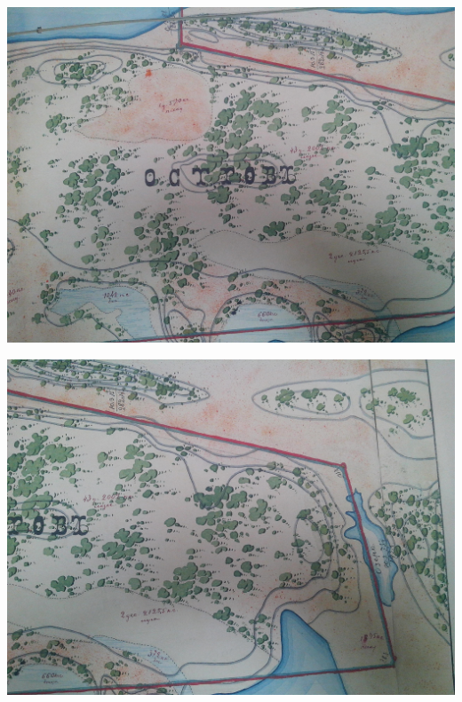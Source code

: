 \begin{center}
\includegraphics[width=\linewidth]{chast-vosp/zver/IMG_20170627_153912.jpg}
\end{center}

\begin{center}
\includegraphics[width=\linewidth]{chast-vosp/zver/IMG_20170627_153915.jpg}
\end{center}

